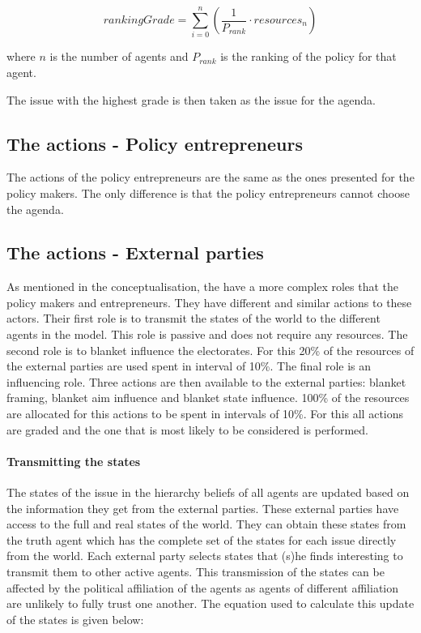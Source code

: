 \begin{equation}
rankingGrade = \sum_{i=0}^n \left( \frac{1}{P_{rank}} \cdot resources_n \right)
\end{equation}

where $n$ is the number of agents and $P_{rank}$ is the ranking of the policy for that agent.

The issue with the highest grade is then taken as the issue for the agenda.

\subsection{The actions - Policy entrepreneurs}

The actions of the policy entrepreneurs are the same as the ones presented for the policy makers. The only difference is that the policy entrepreneurs cannot choose the agenda.

\subsection{The actions - External parties}

As mentioned in the conceptualisation, the have a more complex roles that the policy makers and entrepreneurs. They have different and similar actions to these actors. Their first role is to transmit the states of the world to the different agents in the model. This role is passive and does not require any resources. The second role is to blanket influence the electorates. For this 20\% of the resources of the external parties are used spent in interval of 10\%. The final role is an influencing role. Three actions are then available to the external parties: blanket framing, blanket aim influence and blanket state influence. 100\% of the resources are allocated for this actions to be spent in intervals of 10\%. For this all actions are graded and the one that is most likely to be considered is performed.

\paragraph{Transmitting the states}

The states of the issue in the hierarchy beliefs of all agents are updated based on the information they get from the external parties. These external parties have access to the full and real states of the world. They can obtain these states from the truth agent which has the complete set of the states for each issue directly from the world. Each external party selects states that (s)he finds interesting to transmit them to other active agents. This transmission of the states can be affected by the political affiliation of the agents as agents of different affiliation are unlikely to fully trust one another. The equation used to calculate this update of the states is given below:

